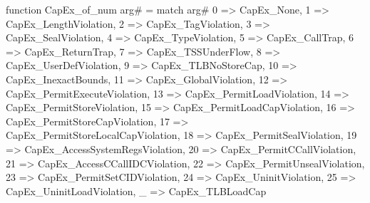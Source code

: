 function CapEx_of_num arg# = match arg# {
  0 => CapEx_None,
  1 => CapEx_LengthViolation,
  2 => CapEx_TagViolation,
  3 => CapEx_SealViolation,
  4 => CapEx_TypeViolation,
  5 => CapEx_CallTrap,
  6 => CapEx_ReturnTrap,
  7 => CapEx_TSSUnderFlow,
  8 => CapEx_UserDefViolation,
  9 => CapEx_TLBNoStoreCap,
  10 => CapEx_InexactBounds,
  11 => CapEx_GlobalViolation,
  12 => CapEx_PermitExecuteViolation,
  13 => CapEx_PermitLoadViolation,
  14 => CapEx_PermitStoreViolation,
  15 => CapEx_PermitLoadCapViolation,
  16 => CapEx_PermitStoreCapViolation,
  17 => CapEx_PermitStoreLocalCapViolation,
  18 => CapEx_PermitSealViolation,
  19 => CapEx_AccessSystemRegsViolation,
  20 => CapEx_PermitCCallViolation,
  21 => CapEx_AccessCCallIDCViolation,
  22 => CapEx_PermitUnsealViolation,
  23 => CapEx_PermitSetCIDViolation,
  24 => CapEx_UninitViolation,
  25 => CapEx_UninitLoadViolation,
  _ => CapEx_TLBLoadCap
}

